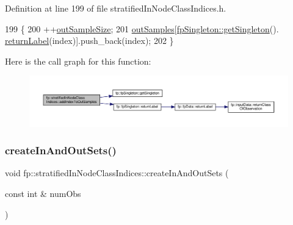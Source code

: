 Definition at line 199 of file stratified\+In\+Node\+Class\+Indices.\+h.


\begin{DoxyCode}
199                                                        \{
200                 ++\hyperlink{classfp_1_1stratifiedInNodeClassIndices_aa947b545e6751902344e832fcc1c9641}{outSampleSize};
201                 \hyperlink{classfp_1_1stratifiedInNodeClassIndices_aa569f727e65e0b4b0815e71c1ee819e8}{outSamples}[\hyperlink{classfp_1_1fpSingleton_a8bdae77b68521003e3fc630edec2e240}{fpSingleton::getSingleton}().
      \hyperlink{classfp_1_1fpSingleton_aa2f644b1521948fb994f4087ddfaea14}{returnLabel}(index)].push\_back(index);
202             \}
\end{DoxyCode}
Here is the call graph for this function\+:
\nopagebreak
\begin{figure}[H]
\begin{center}
\leavevmode
\includegraphics[width=350pt]{classfp_1_1stratifiedInNodeClassIndices_adc99a046031545bc59c2b43abcf75ed9_cgraph}
\end{center}
\end{figure}
\mbox{\label{classfp_1_1stratifiedInNodeClassIndices_a64bc290a78f3800cef41d42ebe64ff1b}} 
\subsubsection{\texorpdfstring{create\+In\+And\+Out\+Sets()}{createInAndOutSets()}}
{\footnotesize\ttfamily void fp\+::stratified\+In\+Node\+Class\+Indices\+::create\+In\+And\+Out\+Sets (\begin{DoxyParamCaption}\item[{const int \&}]{num\+Obs }\end{DoxyParamCaption})\hspace{0.3cm}{\ttfamily [inline]}}



